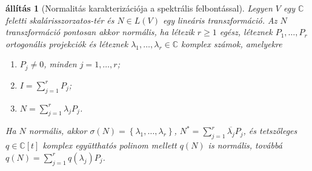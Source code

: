 \documentclass[9pt, a4paper, showtrims]{memoir}
\theoremstyle{plain}
\newtheorem{proposition}{állítás}[chapter]
\theoremstyle{remark}
\theoremstyle{definition}
\begin{document}
\begin{proposition}[Normalitás karakterizációja a spektrális felbontással]
	Legyen $V$ egy $\mathbb{C}$ feletti skalárisszorzatos-tér és $N\in L\left( V \right)$ egy lineáris transzformáció.
	Az $N$ transzformáció pontosan akkor normális,
	ha létezik $r\geq 1$ egész, léteznek $P_1,\ldots,P_r$ ortogonális projekciók és
	léteznek $\lambda_1,\ldots,\lambda_r\in\mathbb{C}$ komplex számok,
	amelyekre
	\begin{enumerate}
		\item $P_j\neq 0$, minden $j=1,\ldots,r$;
		\item $I=\sum_{j=1}^rP_j$;
		\item $N=\sum_{j=1}^r\lambda_jP_j$.
	\end{enumerate}
	Ha $N$ normális,
	akkor $\sigma\left( N \right)=\left\{ \lambda_1,\ldots,\lambda_r \right\}$,
	$N^\ast=\sum_{j=1}^r\overline{\lambda_j}P_j$,
	és tetszőleges $q\in\mathbb{C}[t]$ komplex együtthatós polinom mellett
	$q\left( N \right)$ is normális,
	továbbá
	$q\left( N \right)=\sum_{j=1}^rq\left( \lambda_j \right)P_j$.
\end{proposition}
\end{document}
